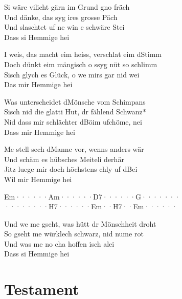 \documentclass[
  letterpaper,
]{scrbook}
\begin{document}
Si wäre vilicht gärn im Grund gno fräch\\
Und dänke, das syg ires grosse Päch\\
Und s\textquotesingle laschtet uf ne win e schwäre Stei\\
Dass si Hemmige hei

I weis, das macht eim heiss, verschlat eim d\textquotesingle Stimm\\
Doch dünkt eim mängisch o s\textquotesingle syg nüt so schlimm\\
S\textquotesingle isch glych es Glück, o we mirs gar nid wei\\
Das mir Hemmige hei

Was unterscheidet d\textquotesingle Mönsche vom Schimpans\\
S\textquotesingle isch nid die glatti Hut, dr fählend Schwanz*\\
Nid dass mir schlächter d\textquotesingle Böim ufchöme, nei\\
Dass mir Hemmige hei

Me stell sech d\textquotesingle Manne vor, wenns anders wär\\
Und s\textquotesingle chäm es hübsches Meiteli derhär\\
Jitz luege mir doch höchstens chly uf d\textquotesingle Bei\\
Wil mir Hemmige hei

\textbar Em······\textbar Am······\textbar D7······\textbar G·······\textbar{}\\
\textbar········\textbar H7······\textbar Em··H7··\textbar Em······\textbar{}

Und we me gseht, was hütt dr Mönschheit droht\\
So gseht me würklech schwarz, nid nume rot\\
Und was me no cha hoffen isch alei\\
Dass si Hemmige hei

\hypertarget{testament}{%
\chapter{Testament}\label{testament}}
\end{document}
